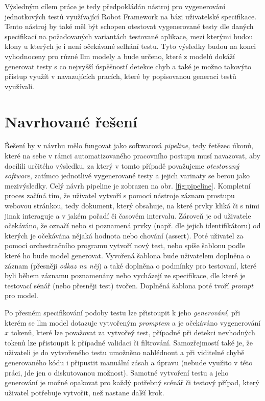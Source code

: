 \documentclass[czech, ma, kiv, he, iso690numb, pdf, viewonly]{fasthesis}
\begin{document}
        Výsledným cílem práce je tedy předpokládán nástroj pro vygenerování jednotkových testů využívající Robot Framework na bázi uživatelské specifikace. Tento nástroj by také měl být schopen otestovat vygenerované testy dle daných specifikací na požadovaných variantách testované aplikace, mezi kterými budou klony u kterých je i není očekávané selhání testu. Tyto výsledky budou na konci vyhodnoceny pro různé \Gls{llm} modely a bude určeno, které z modelů dokáží generovat testy s co nejvyšší úspěšností detekce chyb a také je možno takovýto přístup využít v navazujících pracích, které by popisovanou generaci testů využívali.

        \section{Navrhované řešení} \label{sec:proposal}

        Řešení by v návrhu mělo fungovat jako softwarová \emph{pipeline}, tedy řetězec úkonů, které na sebe v rámci automatizovaného pracovního postupu musí navazovat, aby docílili určitého výsledku, za který v tomto případě považujeme \textit{otestovaný software}, zatímco jednotlivé vygenerované testy a jejich varinaty se berou jako mezivýsledky. Celý návrh pipeline je zobrazen na obr. \ref{fig:pipeline}. Kompletní proces začíná tím, že uživatel vytvoří s pomocí nástroje záznam prostupu webovou stránkou, tedy dokument, který obsahuje, na které prvky kliká či s nimi jinak interaguje a v jakém pořadí či časovém intervalu. Zároveň je od uživatele očekáváno, že označí nebo si poznamená prvky (např. dle jejich identifikátoru) od kterých je očekávána nějaká hodnota nebo chování (assert). Poté uživatel za pomocí orchestračního programu vytvoří nový test, nebo spíše šablonu podle které ho bude model generovat. Vyvořená šablona bude uživatelem doplněna o záznam (přesněji \textit{odkaz na něj}) a také doplněna o podmínky pro testovaní, které byli během záznamu poznamenány nebo vycházejí ze specifikace, dle které je testovací sénář (nebo přesněji test) tvořen. Doplněná šablona poté tvoří \emph{prompt} pro model.

        Po přesném specifikování podoby testu lze přistoupit k jeho \emph{generování}, při kterém se \Gls{llm} model dotazuje vytvořeným \emph{promptem} a je očekáváno vygenerování \(x\) tokenů, které lze považovat za vytvořeý test, případně při detekci nevhodných tokenů lze přistoupit k případné validaci či filtrování. Samozřejmostí také je, že uživateli je do vytvořeného testu umožněno nahlédnout a při viditelné chybě generovaného kódu i připustit manuální zásah a úpravu (nebude využito v této práci, jde jen o diskutovanou možnost). Samotné vytvoření testu a jeho generování je možné opakovat pro každý potřebný scénář či testový případ, který uživatel potřebuje vytvořit, než nastane další krok.
\end{document}
